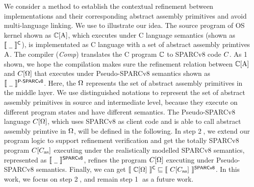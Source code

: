 
We consider a method to establish the contextual 
refinement between implementations and their 
corresponding abstract assembly primitives and 
avoid multi-language linking. 
We use \Fig{\ref{fig:idea to establish contextual refinement}} 
to illustrate our idea. 
The source program of OS kernel  
shown as $\mathbb{C}[\text{A}]$, which executes
under C language semantics (shown as 
$\llbracket \ {\underline{\ \,}} \ \rrbracket^{\textsf{C}}$),   
is implementated as C language 
with a set of abstract assembly primtives $\text{A}$. 
The compiler (\textit{Comp}) translates the 
C program $\mathbb{C}$ to SPARCv8 code $C$. 
As {\color{blue} \textcircled{1}} shown, 
we hope the compilation makes sure the 
refinement relation between $\mathbb{C}[\text{A}]$ and 
$C[\Omega]$ that 
executes under Pseudo-SPARCv8 semantics shown as 
$\llbracket \ {\underline{\ \,}} \ \rrbracket^{\textsf{P-SPARCv8}}$. 
Here, the $\Omega$ represents the set of 
abstract assembly primitives in the middle layer. 
We use distinguished notations to represent 
the set of abstract assembly primitives in source 
and intermediate level, because they execute on 
different program states and have different semantics. 
The Pseudo-SPARCv8 language $C[\Omega]$,  
which uses SPARCv8 as client code and is able to 
call abstract assembly primtive in $\Omega$, 
will be defined in the following.
In step {\color{blue} \textcircled{2}},
we extend our program logic to support refinement 
verification and get the totally SPARCv8 program 
$C[C_{\text{as}}]$ executing under the realistically
modelled SPARCv8 semantics, represented as 
$\llbracket \ {\underline{\ \,}} \ \rrbracket^{\textsf{SPARCv8}}$, refines 
the program $C[\Omega]$ executing 
under Pseudo-SPARCv8 semantics.  
Finally, we can get 
$\llbracket \ {\mathbb{C}[\Omega]} \ \rrbracket^{\textsf{C}}
\sqsubseteq
\llbracket \ {C[C_{\text{as}}]} \ \rrbracket^{\textsf{SPARCv8}}$. 
In this work, we focus on 
step {\color{blue} \textcircled{2}}, and 
remain step {\color{blue} \textcircled{1}} 
as a future work. 


